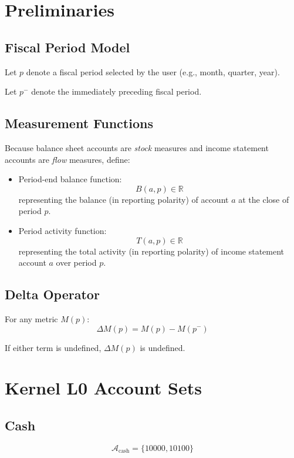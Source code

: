 \documentclass[11pt]{article}
\newcommand{\AccountSet}[1]{\mathcal{A}_{\text{#1}}}
\newcommand{\Balance}{B}
\newcommand{\Total}{T}
\newcommand{\Period}{p}
\newcommand{\Prior}{p^{-}}
\newcommand{\Real}{\mathbb{R}}
\begin{document}
\section{Preliminaries}

\subsection{Fiscal Period Model}
Let $\Period$ denote a fiscal period selected by the user
(e.g., month, quarter, year).

Let $\Prior$ denote the immediately preceding fiscal period.

\subsection{Measurement Functions}

Because balance sheet accounts are \emph{stock} measures and
income statement accounts are \emph{flow} measures, define:

\begin{itemize}
  \item Period-end balance function:
  \[
    \Balance(a, \Period) \in \Real
  \]
  representing the balance (in reporting polarity) of account $a$
  at the close of period $\Period$.

  \item Period activity function:
  \[
    \Total(a, \Period) \in \Real
  \]
  representing the total activity (in reporting polarity) of
  income statement account $a$ over period $\Period$.
\end{itemize}

\subsection{Delta Operator}
For any metric $M(\Period)$:
\[
\Delta M(\Period) = M(\Period) - M(\Prior)
\]

If either term is undefined, $\Delta M(\Period)$ is undefined.

\section{Kernel L0 Account Sets}

\subsection{Cash}
\[
\AccountSet{cash} = \{10000, 10100\}
\]
\end{document}
